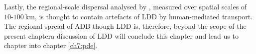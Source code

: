Lastly, the regional-scale dispersal analysed by \cite{grosdidier2018tracking}, measured over spatial scales of $10$-$100\ \mathrm{km}$, is thought to contain artefacts of LDD by human-mediated transport. The regional spread of ADB though LDD is, therefore, beyond the scope of the present chapter\textemdash a discussion of LDD will conclude this chapter and lead us to chapter into chapter \ref{ch7:pde}.



